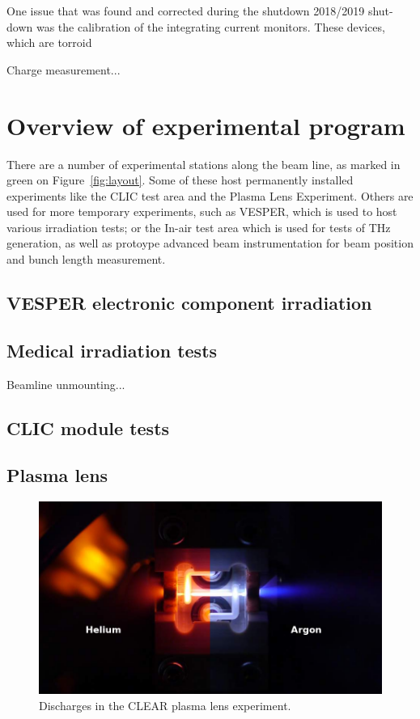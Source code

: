 \documentclass[a4paper,
               keeplastbox,   %
               ]{jacow}
\begin{document}
One issue that was found and corrected during the shutdown 2018/2019 shut-down was the calibration of the integrating current monitors. These devices, which are torroid

Charge measurement...

\section{Overview of experimental program}

There are a number of experimental stations along the beam line, as marked in green on Figure~\ref{fig:layout}.
Some of these host permanently installed experiments like the CLIC test area and the Plasma Lens Experiment.
Others are used for more temporary experiments, such as VESPER, which is used to host various irradiation tests; or the In-air test area which is used for tests of THz generation, as well as protoype advanced beam instrumentation for beam position and bunch length measurement.

\subsection{VESPER electronic component irradiation}

\subsection{Medical irradiation tests}
Beamline unmounting...

\subsection{CLIC module tests}

\subsection{Plasma lens}
\begin{figure}
    \includegraphics[width=\columnwidth]{fig/HeAr.png}
    \caption{Discharges in the CLEAR plasma lens experiment.}
\end{figure}
\end{document}
